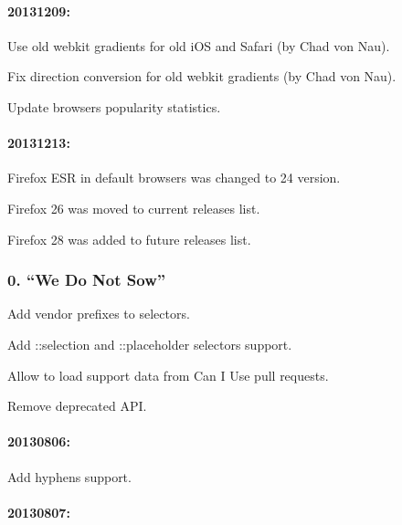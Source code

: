 \paragraph*{20131209\+:}


\begin{DoxyItemize}
\item Use old webkit gradients for old i\+OS and Safari (by Chad von Nau).
\item Fix direction conversion for old webkit gradients (by Chad von Nau).
\item Update browsers popularity statistics.
\end{DoxyItemize}

\paragraph*{20131213\+:}


\begin{DoxyItemize}
\item Firefox E\+SR in default browsers was changed to 24 version.
\item Firefox 26 was moved to current releases list.
\item Firefox 28 was added to future releases list.
\end{DoxyItemize}

\subsubsection*{0. “\+We Do Not Sow”}


\begin{DoxyItemize}
\item Add vendor prefixes to selectors.
\item Add \+::selection and \+::placeholder selectors support.
\item Allow to load support data from Can I Use pull requests.
\item Remove deprecated A\+PI.
\end{DoxyItemize}

\paragraph*{20130806\+:}


\begin{DoxyItemize}
\item Add hyphens support.
\end{DoxyItemize}

\paragraph*{20130807\+:}


